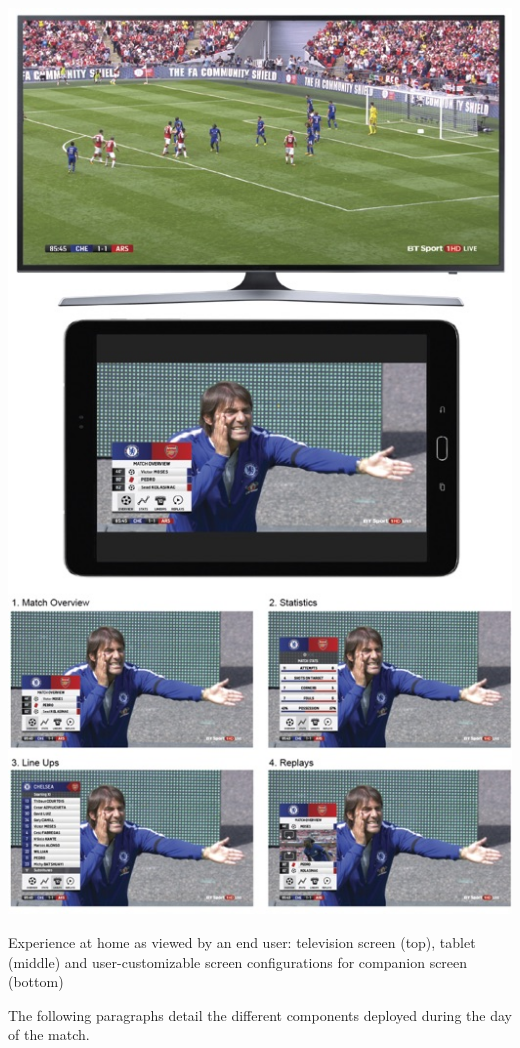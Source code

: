 \documentclass[sigchi-a, authorversion]{acmart}
\begin{document}
\begin{marginfigure}
    \includegraphics[width=\marginparwidth-10pt]{Figures/footballathome1.jpg}
    \caption{Experience at home as viewed by an end user: television screen (top), tablet (middle) and user-customizable screen configurations for companion screen (bottom)}
    \label{fig:homeexperience}
\end{marginfigure}

The following paragraphs detail the different components deployed during the day of the match.
\end{document}
